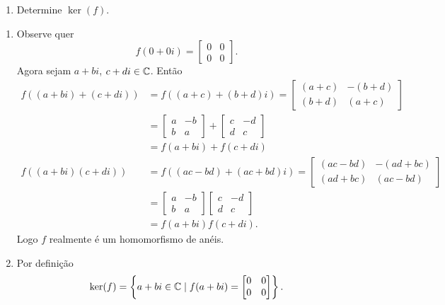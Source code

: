 \begin{exemplo}
\begin{enumerate}[label={\alph*})]
        \item Determine $\ker(f)$.
    \end{enumerate}
    \begin{solucao}
        \begin{enumerate}[label={\alph*})]
            \item Observe quer
                \[
                    f(0 + 0i) = \begin{bmatrix}0 & 0 \\ 0 &0\end{bmatrix}.
                \]
                Agora sejam $a + bi$, $c + di \in \mathbb{C}$. Então
                \begin{align*}
                    f((a + bi) + (c + di)) &= f((a + c) + (b + d)i) = \begin{bmatrix}(a + c) & -(b + d)\\(b + d) & (a + c)\end{bmatrix}\\ &= \begin{bmatrix}a & -b\\b & a
                    \end{bmatrix} + \begin{bmatrix}c & -d\\d & c \end{bmatrix} \\ &= f(a + bi) + f(c + di)\\
                    f((a + bi)(c + di)) &= f((ac - bd) + (ac + bd)i) = \begin{bmatrix}(ac - bd) & -(ad + bc)\\(ad + bc) & (ac - bd)\end{bmatrix}\\ &= \begin{bmatrix}a & -b\\b & a
                    \end{bmatrix}\begin{bmatrix}c & -d\\d & c\end{bmatrix}\\ &= f(a + bi)f(c + di).
                \end{align*}
                Logo $f$ realmente é um homomorfismo de anéis.

            \item Por definição
                \[
                    \ker(f) = \left\{a + bi \in \mathbb{C} \mid f(a + bi) = \begin{bmatrix} 0 & 0\\ 0 & 0\end{bmatrix}\right\}.
                \]


\end{enumerate}
\end{solucao}
\end{exemplo}
